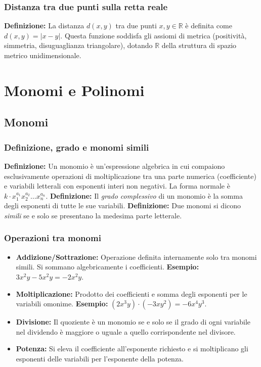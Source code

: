 \subsubsection{Distanza tra due punti sulla retta reale}
\textbf{Definizione:} La distanza $d(x,y)$ tra due punti $x, y \in \mathbb{R}$ è definita come $d(x,y) = |x-y|$. 
Questa funzione soddisfa gli assiomi di metrica (positività, simmetria, disuguaglianza triangolare), dotando $\mathbb{R}$ della struttura di spazio metrico unidimensionale.

\section{Monomi e Polinomi}
\subsection{Monomi}
\subsubsection{Definizione, grado e monomi simili}
\textbf{Definizione:} Un monomio è un'espressione algebrica in cui compaiono esclusivamente operazioni di moltiplicazione tra una parte numerica (coefficiente) e variabili letterali con esponenti interi non negativi. La forma normale è $k \cdot x_1^{a_1} x_2^{a_2} \dots x_n^{a_n}$.
\textbf{Definizione:} Il \textit{grado complessivo} di un monomio è la somma degli esponenti di tutte le sue variabili.
\textbf{Definizione:} Due monomi si dicono \textit{simili} se e solo se presentano la medesima parte letterale.

\subsubsection{Operazioni tra monomi}
\begin{itemize}
    \item \textbf{Addizione/Sottrazione:} Operazione definita internamente solo tra monomi simili. Si sommano algebricamente i coefficienti. \textbf{Esempio:} $3x^2y - 5x^2y = -2x^2y$.
    \item \textbf{Moltiplicazione:} Prodotto dei coefficienti e somma degli esponenti per le variabili omonime. \textbf{Esempio:} $(2x^3y) \cdot (-3xy^2) = -6x^4y^3$.
    \item \textbf{Divisione:} Il quoziente è un monomio se e solo se il grado di ogni variabile nel dividendo è maggiore o uguale a quello corrispondente nel divisore.
    \item \textbf{Potenza:} Si eleva il coefficiente all'esponente richiesto e si moltiplicano gli esponenti delle variabili per l'esponente della potenza.
\end{itemize}

